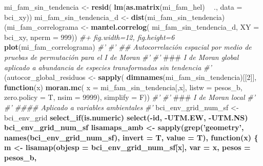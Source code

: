 \documentclass[11pt,]{article}
\newenvironment{Shaded}{\begin{snugshade}}{\end{snugshade}}
\newcommand{\KeywordTok}[1]{\textcolor[rgb]{0.13,0.29,0.53}{\textbf{#1}}}
\newcommand{\DataTypeTok}[1]{\textcolor[rgb]{0.13,0.29,0.53}{#1}}
\newcommand{\DecValTok}[1]{\textcolor[rgb]{0.00,0.00,0.81}{#1}}
\newcommand{\StringTok}[1]{\textcolor[rgb]{0.31,0.60,0.02}{#1}}
\newcommand{\CommentTok}[1]{\textcolor[rgb]{0.56,0.35,0.01}{\textit{#1}}}
\newcommand{\ControlFlowTok}[1]{\textcolor[rgb]{0.13,0.29,0.53}{\textbf{#1}}}
\newcommand{\OperatorTok}[1]{\textcolor[rgb]{0.81,0.36,0.00}{\textbf{#1}}}
\newcommand{\AlertTok}[1]{\textcolor[rgb]{0.94,0.16,0.16}{#1}}
\newcommand{\NormalTok}[1]{#1}
\begin{document}
\begin{Shaded}
\begin{Highlighting}[]
{{{{{{{{{{\NormalTok{mi_fam_sin_tendencia <-}\StringTok{ }\KeywordTok{resid}\NormalTok{(}
  \KeywordTok{lm}\NormalTok{(}\KeywordTok{as.matrix}\NormalTok{(mi_fam_hel) }\OperatorTok{~}\StringTok{ }\NormalTok{.,}
     \DataTypeTok{data =}\NormalTok{ bci_xy))}
\NormalTok{mi_fam_sin_tendencia_d <-}\StringTok{ }\KeywordTok{dist}\NormalTok{(mi_fam_sin_tendencia)}
\NormalTok{(mi_fam_correlograma <-}\StringTok{ }\KeywordTok{mantel.correlog}\NormalTok{(}
\NormalTok{  mi_fam_sin_tendencia_d,}
  \DataTypeTok{XY =}\NormalTok{ bci_xy,}
  \DataTypeTok{nperm =} \DecValTok{999}\NormalTok{))}
\CommentTok{#+ fig.width=12, fig.height=6}
\KeywordTok{plot}\NormalTok{(mi_fam_correlograma)}
\CommentTok{#' }
\CommentTok{#' ## Autocorrelación espacial por medio de pruebas de permutación para el I de Moran}
\CommentTok{#' }
\CommentTok{#' }\AlertTok{###}\CommentTok{ I de Moran global aplicado a abundancia de especies transformadas sin tendencia}
\CommentTok{#' }
\NormalTok{(autocor_global_residuos <-}\StringTok{ }\KeywordTok{sapply}\NormalTok{(}
  \KeywordTok{dimnames}\NormalTok{(mi_fam_sin_tendencia)[[}\DecValTok{2}\NormalTok{]],}
  \ControlFlowTok{function}\NormalTok{(x)}
    \KeywordTok{moran.mc}\NormalTok{(}
      \DataTypeTok{x =}\NormalTok{ mi_fam_sin_tendencia[,x],}
      \DataTypeTok{listw =}\NormalTok{ pesos_b,}
      \DataTypeTok{zero.policy =}\NormalTok{ T,}
      \DataTypeTok{nsim =} \DecValTok{9999}\NormalTok{),}
  \DataTypeTok{simplify =}\NormalTok{ F))}
\CommentTok{#' }
\CommentTok{#' }\AlertTok{###}\CommentTok{ I de Moran local}
\CommentTok{#' }
\CommentTok{#' #### Aplicado a variables ambientales}
\CommentTok{#' }
\NormalTok{bci_env_grid_num_sf <-}\StringTok{ }\NormalTok{bci_env_grid }\OperatorTok{%
\StringTok{  }\KeywordTok{select_if}\NormalTok{(is.numeric) }\OperatorTok{%
\StringTok{  }\KeywordTok{select}\NormalTok{(}\OperatorTok{-}\NormalTok{id, }\OperatorTok{-}\NormalTok{UTM.EW, }\OperatorTok{-}\NormalTok{UTM.NS)}
\NormalTok{bci_env_grid_num_sf }\OperatorTok{%
\NormalTok{lisamaps_amb <-}\StringTok{ }\KeywordTok{sapply}\NormalTok{(}\KeywordTok{grep}\NormalTok{(}\StringTok{'geometry'}\NormalTok{, }\KeywordTok{names}\NormalTok{(bci_env_grid_num_sf), }\DataTypeTok{invert =}\NormalTok{ T, }\DataTypeTok{value =}\NormalTok{ T),}
                       \ControlFlowTok{function}\NormalTok{(x) \{}
\NormalTok{                         m <-}\StringTok{ }\KeywordTok{lisamap}\NormalTok{(}\DataTypeTok{objesp =}\NormalTok{ bci_env_grid_num_sf[x],}
                                      \DataTypeTok{var =}\NormalTok{ x,}
                                      \DataTypeTok{pesos =}\NormalTok{ pesos_b,}
}}}}}}}}}}}}}
\end{Highlighting}
\end{Shaded}
\end{document}
